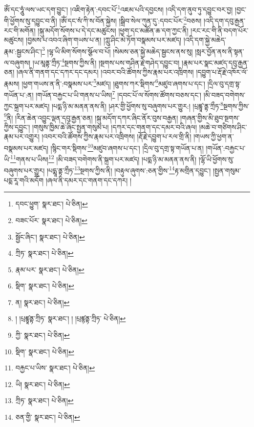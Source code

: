 ཨོཾ་དང་ཧཱུཾ་ལས་ཡང་དག་བྱུང་། །འཇིག་རྟེན་:དབང་པོ་\footnote{དབང་ཕྱུག་  སྣར་ཐང་།  པེ་ཅིན། }འཇམ་པའི་དབྱངས། །འདི་དག་ནུབ་ཏུ་དབྱུང་བར་བྱ། །བྱང་གི་ཕྱོགས་སུ་དབྱུང་བ་ནི། །ཨོཾ་དང་སཾ་ཀི་ས་བོན་སྐྱེས། །སྒྲིབ་སེལ་ཀུན་དུ་:དབང་པོར་\footnote{བཟང་པོར་  སྣར་ཐང་།  པེ་ཅིན། }བཅས། །འདི་དག་དབུ་རྒྱན་རང་གི་མགོན། །སྐུ་མདོག་སོགས་པ་དེ་དང་མཚུངས། །ཕྱག་དང་མཚོན་ཆ་དག་ཀྱང་ནི། །རང་རང་གི་ནི་བདག་པོར་མཚུངས། །བྱམས་པ་འབའ་ཞིག་གཡས་པ་ན། །ཀླུ་ཤིང་མེ་ཏོག་བསྣམས་པར་མཛད། །འདི་དག་སྐྱེ་མཆེད་རྣམ་:སྦྱངས་ཤིང་།\footnote{སྦྱོང་ཞིང་།  སྣར་ཐང་།  པེ་ཅིན། } །ལྷ་ཡི་མིག་སོགས་སྩོལ་བ་པོ། །སེམས་ཅན་སྐྱེ་མཆེད་སྦྱངས་ནས་སུ། །སླར་བྱོན་ནས་ནི་སྟན་ལ་བཞུགས། །ཡ་མཱནྟ་ཀྲྀཏ་\footnote{ཀྲིཏ་  སྣར་ཐང་།  པེ་ཅིན། }སྔགས་ཀྱིས་ནི། །སྔགས་པས་གཤིན་རྗེ་གཤེད་དབྱུང་བ། །རྣམ་པར་སྣང་མཛད་དབུ་རྒྱན་ཅན། །ཞལ་ནི་གནག་དང་དཀར་དང་དམར། །འབར་བའི་ཚོགས་ཀྱིས་རྣམ་པར་འཁྲིགས། །དབྱུག་པ་རྡོ་རྗེ་འཁོར་ལོ་རྣམས། །ཕྱག་གཡས་ན་ནི་:བསྣམས་པར་\footnote{རྣམ་པར་  སྣར་ཐང་།  པེ་ཅིན། }མཛད། །ཐུགས་ཀར་སྡིགས་\footnote{སྡིག་  སྣར་ཐང་།  པེ་ཅིན། }མཛུབ་ཞགས་པ་དང་། །དྲིལ་བུ་དགྲ་སྟ་གཡོན་པ་:ན། །གཡོན་བརྐྱང་པ་ཡི་གནས་པ་ཡིས།\footnote{ན།  སྣར་ཐང་།  པེ་ཅིན། } །དབང་པོ་ལ་སོགས་ཚོགས་བཅས་དང་། །མི་བཟད་བགེགས་ཀྱང་སྐྲག་པར་མཛད། །པདྨ་ཉི་མ་མནན་ནས་ནི། །ཤར་གྱི་ཕྱོགས་སུ་བཞུགས་པར་གྱུར:། །པྲཛྙཱ་ནྟ་ཀྲྀཏ་\footnote{། །པྲཛྙཱནྟ་ཀྲིཏ་  སྣར་ཐང་། ། །པྲཛྙནྟ་ཀྲིཏ་  པེ་ཅིན། }སྔགས་ཀྱིས་\footnote{ཀྱི་  སྣར་ཐང་།  པེ་ཅིན། }ནི། །རིན་ཆེན་འབྱུང་ལྡན་དབུ་རྒྱན་ཅན། །སྐུ་མདོག་དཀར་ཞིང་ནོར་བུས་བརྒྱན། །གཞན་གྱིས་མི་ཐུབ་སྔགས་ཀྱིས་དབྱུང་། །གསུས་ཁྱིམ་ཆེ་ཞིང་སྤྱན་གསུམ་པ། །དཀར་དང་གནག་དང་དམར་བའི་ཞལ། །མཆེ་བ་གཙིགས་ཤིང་རྣམ་པར་འགྱུར། །འབར་བའི་ཚོགས་ཀྱིས་རྣམ་པར་འཁྲིགས། །རྡོ་རྗེ་དབྱུག་པ་རལ་གྲི་ནི། །གཡས་ཀྱི་ཕྱག་ན་བསྣམས་པར་མཛད། །སྙིང་གར་སྡིགས་\footnote{སྡིག་  སྣར་ཐང་།  པེ་ཅིན། }མཛུབ་ཞགས་པ་དང་། །དྲིལ་བུ་དགྲ་སྟ་གཡོན་པ་ན། །གཡོན་:བརྐྱང་པ་ཡི་\footnote{བརྐྱང་པ་ཡིས་  སྣར་ཐང་།  པེ་ཅིན། }གནས་པ་ཡིས།\footnote{ཡི།  སྣར་ཐང་།  པེ་ཅིན། } །མི་བཟད་བགེགས་ནི་སྐྲག་པར་མཛད། །པདྨ་ཉི་མ་མནན་ནས་ནི། །ལྷོ་ཡི་ཕྱོགས་སུ་བཞུགས་པར་གྱུར། །པདྨཱ་ནྟ་ཀྲྀཏ་\footnote{ཀྲིཏ་  སྣར་ཐང་།  པེ་ཅིན། }སྔགས་ཀྱིས་ནི། །བརྟུལ་ཞུགས་:ཅན་གྱིས་\footnote{ཅན་གྱི་  སྣར་ཐང་།  པེ་ཅིན། }རྟ་མགྲིན་དབྱུང་། །སྤྱན་གསུམ་པདྨ་རཱ་གའི་མདོག །ཞལ་ནི་དམར་དང་གནག་དང་དཀར། །
